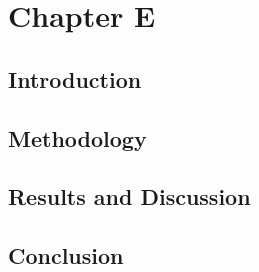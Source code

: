 \chapter{Chapter E} 
\label{chap:e}

\section{Introduction}

\section{Methodology}

\section{Results and Discussion}

\section{Conclusion}